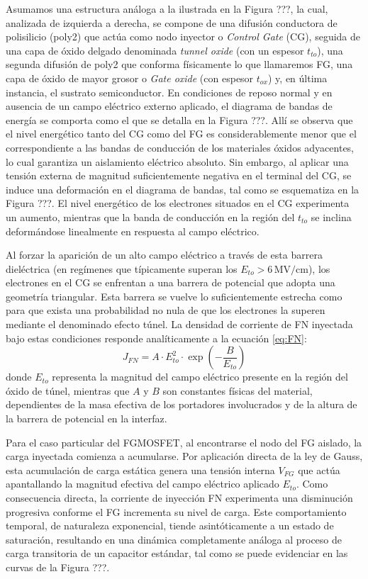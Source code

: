 \documentclass[12pt,a4paper,oneside]{book}
\begin{document}
Asumamos una estructura análoga a la ilustrada en la Figura ???, la cual, analizada de izquierda a derecha, se compone de una difusión conductora de polisilicio (poly2) que actúa como nodo inyector o \textit{Control Gate} (CG), seguida de una capa de óxido delgado denominada \textit{tunnel oxide} (con un espesor $t_{to}$), una segunda difusión de poly2 que conforma físicamente lo que llamaremos FG, una capa de óxido de mayor grosor o \textit{Gate oxide} (con espesor $t_{ox}$) y, en última instancia, el sustrato semiconductor. En condiciones de reposo normal y en ausencia de un campo eléctrico externo aplicado, el diagrama de bandas de energía se comporta como el que se detalla en la Figura ???. Allí se observa que el nivel energético tanto del CG como del FG es considerablemente menor que el correspondiente a las bandas de conducción de los materiales óxidos adyacentes, lo cual garantiza un aislamiento eléctrico absoluto. Sin embargo, al aplicar una tensión externa de magnitud suficientemente negativa en el terminal del CG, se induce una deformación en el diagrama de bandas, tal como se esquematiza en la Figura ???. El nivel energético de los electrones situados en el CG experimenta un aumento, mientras que la banda de conducción en la región del $t_{to}$ se inclina deformándose linealmente en respuesta al campo eléctrico.

Al forzar la aparición de un alto campo eléctrico a través de esta barrera dieléctrica (en regímenes que típicamente superan los $E_{to} > 6\,\text{MV/cm}$), los electrones en el CG se enfrentan a una barrera de potencial que adopta una geometría triangular. Esta barrera se vuelve lo suficientemente estrecha como para que exista una probabilidad no nula de que los electrones la superen mediante el denominado efecto túnel. La densidad de corriente de FN inyectada bajo estas condiciones responde analíticamente a la ecuación \eqref{eq:FN}:
\begin{equation}
J_{FN} = A \cdot E_{to}^2 \cdot \exp\left(-\frac{B}{E_{to}}\right)
\label{eq:FN}
\end{equation}
donde $E_{to}$ representa la magnitud del campo eléctrico presente en la región del óxido de túnel, mientras que $A$ y $B$ son constantes físicas del material, dependientes de la masa efectiva de los portadores involucrados y de la altura de la barrera de potencial en la interfaz.

Para el caso particular del FGMOSFET, al encontrarse el nodo del FG aislado, la carga inyectada comienza a acumularse. Por aplicación directa de la ley de Gauss, esta acumulación de carga estática genera una tensión interna $V_{FG}$ que actúa apantallando la magnitud efectiva del campo eléctrico aplicado $E_{to}$. Como consecuencia directa, la corriente de inyección FN experimenta una disminución progresiva conforme el FG incrementa su nivel de carga. Este comportamiento temporal, de naturaleza exponencial, tiende asintóticamente a un estado de saturación, resultando en una dinámica completamente análoga al proceso de carga transitoria de un capacitor estándar, tal como se puede evidenciar en las curvas de la Figura ???.
\end{document}
